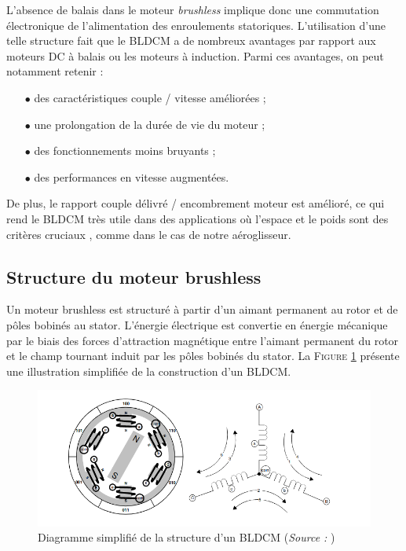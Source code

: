 	 	L'absence de balais dans le moteur \textit{brushless} implique
	 	donc une commutation électronique de l'alimentation des enroulements
	 	statoriques. 
	 	L'utilisation d'une telle structure fait que le BLDCM a de nombreux
	 	avantages par rapport aux moteurs DC à balais ou les moteurs à 
	 	induction. Parmi ces avantages, on peut notamment retenir :
	 	
	 	\vspace{0.5em}
		
		\begin{itemize}
			\item[$\bullet$] des caractéristiques couple / vitesse améliorées ;
			\item[$\bullet$] une prolongation de la durée de vie du moteur ;
			\item[$\bullet$] des fonctionnements moins bruyants ;
			\item[$\bullet$] des performances en vitesse augmentées.
		\end{itemize}
		
		\vspace{0.5em}
			
		De plus, le rapport couple délivré / encombrement moteur 
		est amélioré, ce qui rend le BLDCM très utile dans des 
		applications où l'espace et le poids sont des critères 
		cruciaux \cite{AN885}, comme dans le cas de notre aéroglisseur.
			
			\subsection{Structure du moteur brushless}
				
			Un moteur brushless est structuré à partir d'un aimant permanent
			au rotor et de pôles bobinés au stator. L'énergie électrique est
			convertie en énergie mécanique par le biais des forces d'attraction
			magnétique entre l'aimant permanent du rotor et le champ tournant
			induit par les pôles bobinés du stator. 
			La \textsc{Figure \ref{struct_bldcm}} présente une illustration 
			simplifiée de la construction d'un BLDCM. 
				 
			\begin{figure}
				\begin{center}
				 	\includegraphics[scale=0.7]{../Illus/struct_bldcm.png}
				\end{center}
				\caption{Diagramme simplifié de la structure d'un BLDCM (\textit{Source :} \cite{AN857})}
				\label{struct_bldcm}
			\end{figure}
				 
